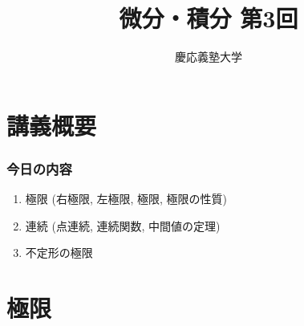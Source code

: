 \documentclass[dvipdfmx,cjk,10.2pt]{beamer}
\theoremstyle{definition}
\begin{document}
\title{微分・積分 第3回} 
\author{慶応義塾大学}            %
\date{}



\begin{frame}                  %
\titlepage                     %
\end{frame}








\section{講義概要}


\begin{frame}
\frametitle{今日の内容}



\begin{enumerate}
\item 極限 (右極限, 左極限, 極限, 極限の性質)
\item 連続 (点連続, 連続関数, 中間値の定理)
\item 不定形の極限
\end{enumerate} 



\end{frame}







\section{極限}
\end{document}
